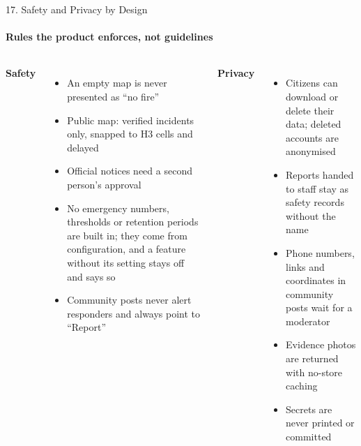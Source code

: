 \begin{frame}{17. Safety and Privacy by Design}
\framesubtitle{Rules the product enforces, not guidelines}
\scriptsize
\begin{columns}[T,onlytextwidth]
    \textbf{\textcolor{amritaMaroon}{Safety}}
    \begin{itemize}\setlength\itemsep{2pt}
        \item An empty map is never presented as ``no fire''
        \item Public map: verified incidents only, snapped to H3 cells and delayed
        \item Official notices need a second person's approval
        \item No emergency numbers, thresholds or retention periods are built in; they come from configuration, and a feature without its setting stays off and says so
        \item Community posts never alert responders and always point to ``Report''
    \end{itemize}
    \textbf{\textcolor{amritaMaroon}{Privacy}}
    \begin{itemize}\setlength\itemsep{2pt}
        \item Citizens can download or delete their data; deleted accounts are anonymised
        \item Reports handed to staff stay as safety records without the name
        \item Phone numbers, links and coordinates in community posts wait for a moderator
        \item Evidence photos are returned with no-store caching
        \item Secrets are never printed or committed
    \end{itemize}
\end{columns}
\end{frame}

